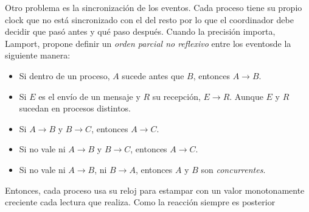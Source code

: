 Otro problema es la sincronización de los eventos. Cada proceso tiene su propio clock que no está sincronizado con el del resto por lo que el coordinador debe decidir que pasó antes y qué paso después. Cuando la precisión importa, Lamport, propone definir un \textit{orden parcial no reflexivo} entre los eventosde la siguiente manera:
\begin{itemize}
	\item Si dentro de un proceso, $A$ sucede antes que $B$, entonces $A \rightarrow B$.
	\item Si $E$ es el envío de un mensaje y $R$ su recepción, $E \rightarrow R$. Aunque $E$ y $R$ sucedan en procesos distintos.
	\item Si $A \rightarrow B$ y $B \rightarrow C$, entonces $A \rightarrow C$.
	\item Si no vale ni $A \rightarrow B$ y $B \rightarrow C$, entonces $A \rightarrow C$.
	\item Si no vale ni $A \rightarrow B$, ni $B \rightarrow A$, entonces $A$ y $B$ son \textit{concurrentes}.
\end{itemize}

Entonces, cada proceso usa su reloj para estampar con un valor monotonamente creciente cada lectura que realiza. Como la reacción siempre es posterior
\subsection{}
\subsection{}
\subsection{}
\subsection{}
\subsection{}
\subsection{}
\subsection{}
